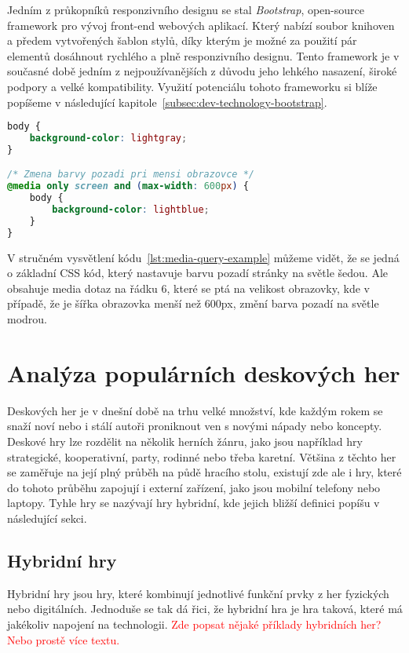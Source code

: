 Jedním z průkopníků responzivního designu se stal \textit{Bootstrap}, open-source framework pro vývoj front-end webových aplikací. Který nabízí soubor knihoven a předem vytvořených šablon stylů, díky kterým je možné za použití pár elementů dosáhnout rychlého a plně responzivního designu. Tento framework je v současné době jedním z nejpoužívanějších z důvodu jeho lehkého nasazení, široké podpory a velké kompatibility. Využití potenciálu tohoto frameworku si blíže popíšeme v následující kapitole~\ref{subsec:dev-technology-bootstrap}.

\begin{lstlisting}[style=customcss, language=CSS, caption={Příklad media query pro změnu barvy pozadí pri menší obrazovce}, label={lst:media-query-example}]
body {
    background-color: lightgray;
}

/* Zmena barvy pozadi pri mensi obrazovce */
@media only screen and (max-width: 600px) {
    body {
        background-color: lightblue;
    }
}
\end{lstlisting}

V stručném vysvětlení kódu~\ref{lst:media-query-example} můžeme vidět, že se jedná o základní CSS kód, který nastavuje barvu pozadí stránky na světle šedou. Ale obsahuje media dotaz na řádku 6, které se ptá na velikost obrazovky, kde v případě, že je šířka obrazovka menší než 600px, změní barva pozadí na světle modrou.

\section{Analýza populárních deskových her}
\label{sec:popular-board-games-analysis}
Deskových her je v dnešní době na trhu velké množství, kde každým rokem se snaží noví nebo i stálí autoři proniknout ven s novými nápady nebo koncepty. Deskové hry lze rozdělit na několik herních žánru, jako jsou například hry strategické, kooperativní, party, rodinné nebo třeba karetní. Většina z těchto her se zaměřuje na její plný průběh na půdě hracího stolu, existují zde ale i hry, které do tohoto průběhu zapojují i externí zařízení, jako jsou mobilní telefony nebo laptopy. Tyhle hry se nazývají hry hybridní, kde jejich bližší definici popíšu v následující sekci.

\subsection*{Hybridní hry}
\label{subsec:popular-board-games-analysis-hybrid-games}
Hybridní hry jsou hry, které kombinují jednotlivé funkční prvky z her fyzických nebo digitálních. Jednoduše se tak dá řici, že hybridní hra je hra taková, které má jakékoliv napojení na technologii. \textcolor{red}{Zde popsat nějaké příklady hybridních her? Nebo prostě více textu.}

